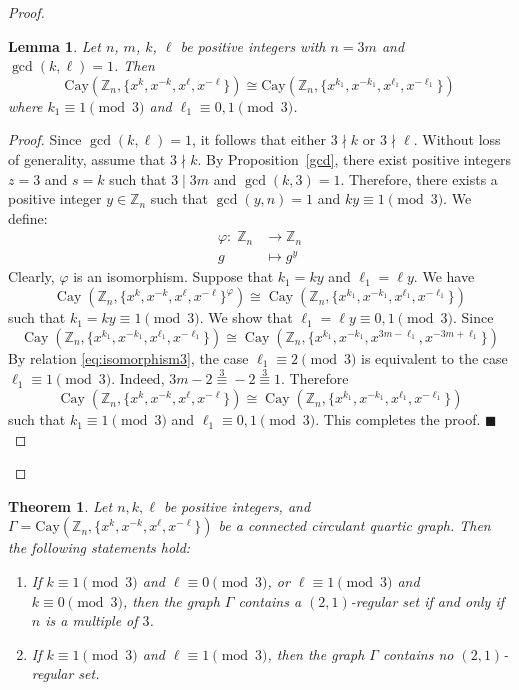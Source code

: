 \documentclass[12pt]{article}
\newtheorem{lemA}[propA]{Lemma}
\newtheorem{thmA}[propA]{Theorem}
\begin{document}
\begin{proof}
 \begin{lemA}\label{lem:three_case}
	Let $n$, $m$, $k$, $\ell$ be positive integers with $n=3m$ and $\gcd(k,\ell)=1$. Then
	\[
	\mathrm{Cay}(\mathbb{Z}_n,\{x^k, x^{-k}, x^\ell, x^{-\ell}\}) \cong
	\mathrm{Cay}(\mathbb{Z}_n,\{x^{k_1}, x^{-k_1}, x^{\ell_1}, x^{-\ell_1}\})
	\]
	where $k_1 \equiv 1 \pmod{3}$ and $\ell_1 \equiv 0,1 \pmod{3}$.
\end{lemA}
\begin{proof}
	Since $\gcd(k,\ell)=1$, it follows that either $3\nmid k$ or $3\nmid \ell$. Without loss of generality, assume that $3\nmid k$. By Proposition~\ref{gcd}, there exist positive integers $z=3$ and $s=k$ such that $3 \mid 3m$ and $\gcd(k,3)=1$. Therefore, there exists a positive integer $y \in \mathbb{Z}_n$ such that
	$\gcd(y,n)=1$ and $ky \equiv 1 \pmod{3}$.
	We define:
	\[
	\begin{aligned}
		\varphi :\; \mathbb{Z}_n &\to \mathbb{Z}_n \\
		g &\mapsto g^{y}
	\end{aligned}
	\]
	Clearly, $\varphi$ is an isomorphism. Suppose that $k_1 = ky$ and $\ell_1 = \ell y$. We have
	\[
	\operatorname{Cay}(\mathbb{Z}_n,\{x^k, x^{-k}, x^{\ell}, x^{-\ell}\}^{\varphi})
	\cong
	\operatorname{Cay}(\mathbb{Z}_n,\{x^{k_1}, x^{-k_1}, x^{\ell_1}, x^{-\ell_1}\})
	\]
	such that $k_1 = ky \equiv 1 \pmod{3}$. We show that $\ell_1= \ell y\equiv 0,1 \pmod{3}$. Since
	\begin{equation}\label{eq:isomorphism3}
		\operatorname{Cay}\left(\mathbb{Z}_n,\{x^{k_1},x^{-k_1},x^{\ell_1},x^{-\ell_1}\}\right)
		\cong
		\operatorname{Cay}\left(\mathbb{Z}_n,\{x^{k_1},x^{-k_1},x^{3m-\ell_1},x^{-3m+\ell_1}\}\right)
	\end{equation}	
	By relation  \eqref{eq:isomorphism3}, the case $\ell_1 \equiv 2 \pmod{3}$ is equivalent to the case $\ell_1 \equiv 1 \pmod{3}$. Indeed,
	$
	3m-2 \stackrel{3}{\equiv} -2 \stackrel{3}{\equiv} 1
$.
	Therefore
	\[
	\operatorname{Cay}(\mathbb{Z}_n,\{x^k, x^{-k}, x^{\ell}, x^{-\ell}\})
	\cong
	\operatorname{Cay}(\mathbb{Z}_n,\{x^{k_1}, x^{-k_1}, x^{\ell_1}, x^{-\ell_1}\})
	\]
	such that $k_1 \equiv 1 \pmod{3}$ and  $\ell_1 \equiv 0,1 \pmod{3}$. This completes the proof.
	\hfill$\blacksquare$
\end{proof}    	
   \end{proof}
  \begin{thmA}\label{thm:21}
 	Let $n, k, \ell$ be positive integers, and $\Gamma = \mathrm{Cay}(\mathbb{Z}_n, \{x^k, x^{-k}, x^\ell, x^{-\ell}\})$ be a connected circulant quartic graph. Then the following statements hold:
 	\begin{enumerate}
 		\item[(i)] If \(k\equiv 1 \pmod{3}\) and \(\ell\equiv 0 \pmod{3}\), or \(\ell\equiv 1 \pmod{3}\) and \(k\equiv 0 \pmod{3}\), then the graph \(\Gamma\) contains a \((2,1)\)-regular set if and only if $n$ is a multiple of $3$.
 		\item[(ii)] If \(k \equiv 1 \pmod{3}\) and \(\ell \equiv 1 \pmod{3}\), then the graph \(\Gamma\) contains no \((2,1)\)-regular set.
 	\end{enumerate}
 \end{thmA}
\end{document}
